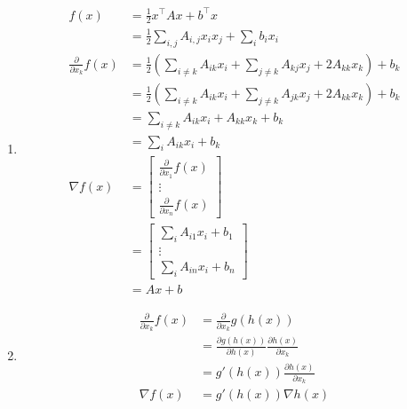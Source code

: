 \item 
\begin{enumerate}
    \item \begin{answer}
        \begin{align*}
            f(x) &= \frac{1}{2} x^{\top}Ax + b^{\top}x \\
            &= \frac{1}{2} \sum_{i, j} A_{i, j} x_i x_j  + \sum_i b_i x_i \\
            \frac{\partial}{\partial x_k} f(x) &= \frac{1}{2}(\sum_{i \ne k} A_{ik} x_i + \sum_{j \ne k} A_{kj} x_j + 2A_{kk} x_k) + b_k \\
            &= \frac{1}{2}(\sum_{i \ne k} A_{ik} x_i + \sum_{j \ne k} A_{jk} x_j + 2A_{kk} x_k) + b_k \\
            &= \sum_{i \ne k} A_{ik} x_i + A_{kk} x_k + b_k \\
            &= \sum_i A_{ik} x_i + b_k \\
            \nabla f(x) &= \begin{bmatrix}
                \frac{\partial}{\partial x_1} f(x) \\
                \vdots \\
                \frac{\partial}{\partial x_n} f(x)
            \end{bmatrix} \\
            &= \begin{bmatrix}
                \sum_i A_{i1} x_i + b_1 \\
                \vdots \\
                \sum_i A_{in} x_i + b_n
            \end{bmatrix} \\
            &= Ax + b
        \end{align*}
    \end{answer}
    
    \item \begin{answer}
        \begin{align*}
            \frac{\partial}{\partial x_k} f(x) &= \frac{\partial}{\partial x_k} g(h(x)) \\
            &= \frac{\partial g(h(x))}{\partial h(x)} \frac{\partial h(x)}{\partial x_k} \\
            &= g'(h(x)) \frac{\partial h(x)}{\partial x_k} \\
            \nabla f(x) &= g'(h(x)) \nabla h(x)
        \end{align*}
    \end{answer}


\end{enumerate}
